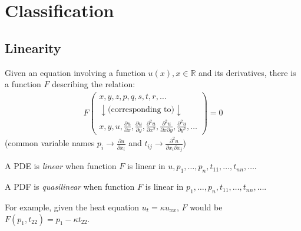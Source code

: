 \section{Classification}\label{sec:classification}
\begin{center}
\end{center}

\subsection{Linearity}\label{subsec:linearity}
Given an equation involving a function $u(x), x\in\mathbb{R}$ and its derivatives,
there is a function $F$ describing the relation:
\begin{align*}
    F\left(
    \begin{matrix}
        x,y,z,p,q,s,t,r,\ldots                         \\
        \downarrow \text{(corresponding to)}\downarrow \\
        x, y, u, \frac{\partial u}{\partial x}, \frac{\partial u}{\partial y}, \frac{\partial^2 u}{\partial x^2},
        \frac{\partial^2 u}{\partial x\partial y},\frac{\partial^2 u}{\partial y^2}, \ldots
    \end{matrix}
    \right) = 0
\end{align*}
(common variable names $p_i\rightarrow\frac{\partial u}{\partial x_i}$ and
$t_{ij} \rightarrow\frac{\partial^2 u}{\partial x_i\partial x_j}$)

A PDE is \emph{linear} when function $F$ is linear in $u,p_1,\ldots,p_n,t_{11},\ldots,t_{nn},\ldots.$

A PDF is \emph{quasilinear} when function $F$ is linear in $p_1,\ldots,p_n,t_{11},\ldots,t_{nn},\ldots.$

For example, given the heat equation $u_t=\kappa u_{xx}$, $F$ would be $F(p_1,t_{22})=p_1-\kappa t_{22}$.

